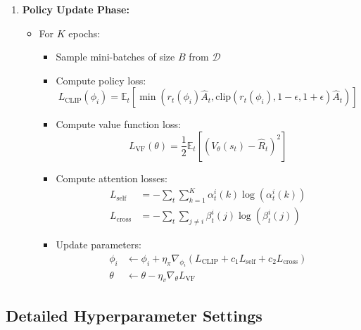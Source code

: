 \begin{enumerate}
\begin{enumerate}
   \item \textbf{Policy Update Phase:}
      \begin{itemize}
      \item For $K$ epochs:
         \begin{itemize}
         \item Sample mini-batches of size $B$ from $\mathcal{D}$
         \item Compute policy loss:
         \[
         L_{\text{CLIP}}(\phi_i) = \mathbb{E}_t[\min(r_t(\phi_i)\hat{A}_t, \text{clip}(r_t(\phi_i), 1-\epsilon, 1+\epsilon)\hat{A}_t)]
         \]
         \item Compute value function loss:
         \[
         L_{\text{VF}}(\theta) = \frac{1}{2}\mathbb{E}_t[(V_\theta(s_t) - \hat{R}_t)^2]
         \]
         \item Compute attention losses:
         \begin{align*}
         L_{\text{self}} &= -\sum_t\sum_{k=1}^K \alpha_t^i(k)\log(\alpha_t^i(k)) \\
         L_{\text{cross}} &= -\sum_t\sum_{j\neq i} \beta_t^i(j)\log(\beta_t^i(j))
         \end{align*}
         \item Update parameters:
         \begin{align*}
         \phi_i &\leftarrow \phi_i + \eta_\pi\nabla_{\phi_i}(L_{\text{CLIP}} + c_1L_{\text{self}} + c_2L_{\text{cross}}) \\
         \theta &\leftarrow \theta - \eta_v\nabla_\theta L_{\text{VF}}
         \end{align*}
         \end{itemize}
      \end{itemize}
   \end{enumerate}
\end{enumerate}

\subsection*{Detailed Hyperparameter Settings}

